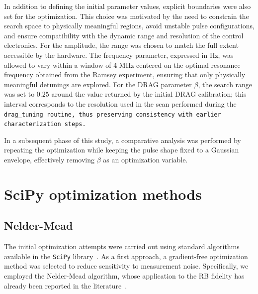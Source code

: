 In addition to defining the initial parameter values, explicit boundaries were also set for the optimization. 
This choice was motivated by the need to constrain the search space to physically meaningful regions, avoid unstable pulse configurations, and ensure compatibility with the dynamic range and resolution of the control electronics.
For the amplitude, the range was chosen to match the full extent accessible by the hardware. 
The frequency parameter, expressed in Hz, was allowed to vary within a window of 4 MHz centered on the optimal resonance frequency obtained from the Ramsey experiment, ensuring that only physically meaningful detunings are explored. 
For the DRAG parameter $\beta$, the search range was set to $0.25$ around the value returned by the initial DRAG calibration; this interval corresponds to the resolution used in the scan performed during the \tt{drag\_tuning} routine, thus preserving consistency with earlier characterization steps.

In a subsequent phase of this study, a comparative analysis was performed by repeating the optimization while keeping the pulse shape fixed to a Gaussian envelope, effectively removing $\beta$ as an optimization variable. 

\section{SciPy optimization methods}\label{Sec:OptimizationMethods}

\subsection{Nelder-Mead}
The initial optimization attempts were carried out using standard algorithms available in the \texttt{SciPy} library~\cite{SciPy-NMeth}. 
As a first approach, a gradient-free optimization method was selected to reduce sensitivity to measurement noise. 
Specifically, we employed the Nelder-Mead algorithm, whose application to the RB fidelity has already been reported in the literature~\cite{kelly_optimal_2014}.

